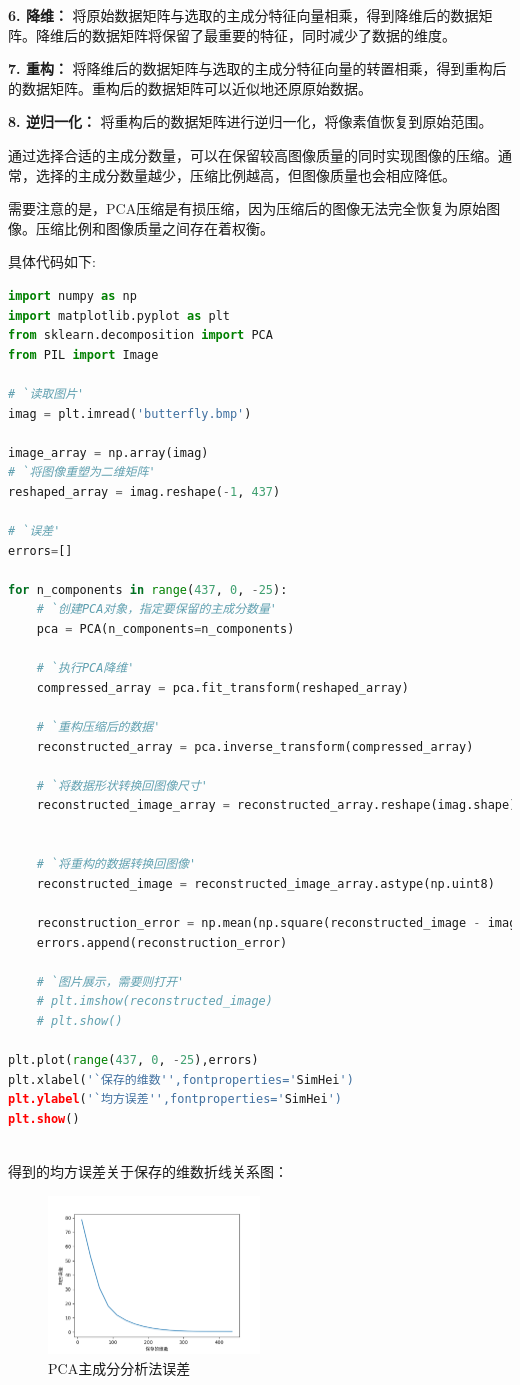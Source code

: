 \documentclass[UTF8]{ctexart}
\begin{document}
\textbf{6. 降维：} 将原始数据矩阵与选取的主成分特征向量相乘，得到降维后的数据矩阵。降维后的数据矩阵将保留了最重要的特征，同时减少了数据的维度。

\textbf{7. 重构：} 将降维后的数据矩阵与选取的主成分特征向量的转置相乘，得到重构后的数据矩阵。重构后的数据矩阵可以近似地还原原始数据。

\textbf{8. 逆归一化：} 将重构后的数据矩阵进行逆归一化，将像素值恢复到原始范围。

通过选择合适的主成分数量，可以在保留较高图像质量的同时实现图像的压缩。通常，选择的主成分数量越少，压缩比例越高，但图像质量也会相应降低。

需要注意的是，PCA压缩是有损压缩，因为压缩后的图像无法完全恢复为原始图像。压缩比例和图像质量之间存在着权衡。

具体代码如下:
\begin{lstlisting}[language=Python]
  import numpy as np
import matplotlib.pyplot as plt
from sklearn.decomposition import PCA
from PIL import Image

# `读取图片'
imag = plt.imread('butterfly.bmp')

image_array = np.array(imag)
# `将图像重塑为二维矩阵'
reshaped_array = imag.reshape(-1, 437)

# `误差'
errors=[]

for n_components in range(437, 0, -25):
    # `创建PCA对象，指定要保留的主成分数量'
    pca = PCA(n_components=n_components)

    # `执行PCA降维'
    compressed_array = pca.fit_transform(reshaped_array)

    # `重构压缩后的数据'
    reconstructed_array = pca.inverse_transform(compressed_array)

    # `将数据形状转换回图像尺寸'
    reconstructed_image_array = reconstructed_array.reshape(imag.shape)


    # `将重构的数据转换回图像'
    reconstructed_image = reconstructed_image_array.astype(np.uint8)

    reconstruction_error = np.mean(np.square(reconstructed_image - image_array))
    errors.append(reconstruction_error)

    # `图片展示，需要则打开'
    # plt.imshow(reconstructed_image)
    # plt.show()

plt.plot(range(437, 0, -25),errors)
plt.xlabel('`保存的维数'',fontproperties='SimHei')
plt.ylabel('`均方误差'',fontproperties='SimHei')
plt.show()
  
\end{lstlisting}
得到的均方误差关于保存的维数折线关系图：
\begin{figure}[htbp]
  \centering
  \includegraphics[width=0.5\textwidth]{5.png}
  \caption{PCA主成分分析法误差}
  \label{fig:example}
\end{figure}
\end{document}
